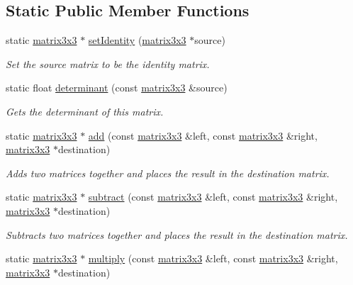 \subsection*{Static Public Member Functions}
\begin{DoxyCompactItemize}
\item 
static \hyperlink{classflounder_1_1matrix3x3}{matrix3x3} $\ast$ \hyperlink{classflounder_1_1matrix3x3_adf3b56d6ebbfae9a30ba46b220ca619b}{set\+Identity} (\hyperlink{classflounder_1_1matrix3x3}{matrix3x3} $\ast$source)
\begin{DoxyCompactList}\small\item\em Set the source matrix to be the identity matrix. \end{DoxyCompactList}\item 
static float \hyperlink{classflounder_1_1matrix3x3_a617309da3506ce9a683573855a31ce22}{determinant} (const \hyperlink{classflounder_1_1matrix3x3}{matrix3x3} \&source)
\begin{DoxyCompactList}\small\item\em Gets the determinant of this matrix. \end{DoxyCompactList}\item 
static \hyperlink{classflounder_1_1matrix3x3}{matrix3x3} $\ast$ \hyperlink{classflounder_1_1matrix3x3_af2284c32da51595e16e9802b9f398ac7}{add} (const \hyperlink{classflounder_1_1matrix3x3}{matrix3x3} \&left, const \hyperlink{classflounder_1_1matrix3x3}{matrix3x3} \&right, \hyperlink{classflounder_1_1matrix3x3}{matrix3x3} $\ast$destination)
\begin{DoxyCompactList}\small\item\em Adds two matrices together and places the result in the destination matrix. \end{DoxyCompactList}\item 
static \hyperlink{classflounder_1_1matrix3x3}{matrix3x3} $\ast$ \hyperlink{classflounder_1_1matrix3x3_a1463caf26c6c57264d767f09f3ef954d}{subtract} (const \hyperlink{classflounder_1_1matrix3x3}{matrix3x3} \&left, const \hyperlink{classflounder_1_1matrix3x3}{matrix3x3} \&right, \hyperlink{classflounder_1_1matrix3x3}{matrix3x3} $\ast$destination)
\begin{DoxyCompactList}\small\item\em Subtracts two matrices together and places the result in the destination matrix. \end{DoxyCompactList}\item 
static \hyperlink{classflounder_1_1matrix3x3}{matrix3x3} $\ast$ \hyperlink{classflounder_1_1matrix3x3_a7c46f7546804f85fc8d8c55f39c044fd}{multiply} (const \hyperlink{classflounder_1_1matrix3x3}{matrix3x3} \&left, const \hyperlink{classflounder_1_1matrix3x3}{matrix3x3} \&right, \hyperlink{classflounder_1_1matrix3x3}{matrix3x3} $\ast$destination)

\end{DoxyCompactItemize}
